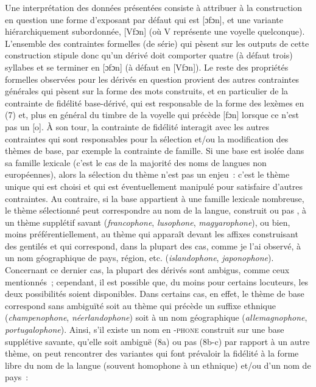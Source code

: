\documentclass[output=paper]{langsci/langscibook}
\begin{document}
Une interprétation des données présentées consiste à attribuer à la
construction en question une forme d'exposant par défaut qui est
{[}ɔfɔn{]}, et une variante hiérarchiquement subordonnée, {[}Vfɔn{]} (où
V représente une voyelle quelconque). L'ensemble des contraintes
formelles (de série) qui pèsent sur les outputs de cette construction
stipule donc qu'un dérivé doit comporter quatre (à défaut trois)
syllabes et se terminer en {[}ɔfɔn{]} (à défaut en {[}Vfɔn{]}). Le reste
des propriétés formelles observées pour les dérivés en question provient
des autres contraintes générales qui pèsent sur la forme des mots
construits, et en particulier de la contrainte de fidélité base-dérivé,
qui est responsable de la forme des lexèmes en (7) et, plus en général
du timbre de la voyelle qui précède {[}fɔn{]} lorsque ce n'est pas un
{[}o{]}. À son tour, la contrainte de fidélité interagit avec les autres
contraintes qui sont responsables pour la sélection et/ou la
modification des thèmes de base, par exemple la contrainte de famille.
Si une base est isolée dans sa famille lexicale (c'est le cas de la
majorité des noms de langues non européennes), alors la sélection du
thème n'est pas un enjeu~: c'est le thème unique qui est choisi et qui
est éventuellement manipulé pour satisfaire d'autres contraintes. Au
contraire, si la base appartient à une famille lexicale nombreuse, le
thème sélectionné peut correspondre au nom de la langue, construit ou
pas %
\citep[\emph{coréanophone}, \emph{corsophone}, \emph{picardophone}, cela correspond, grosso modo, à la «~Contrainte de fidélité à la forme libre~» de][1873]{Roche14}%
%
, à un thème supplétif savant
(\emph{francophone}, \emph{lusophone}, \emph{magyarophone}), ou bien,
moins préférentiellement, au thème qui apparaît devant les affixes
construisant des gentilés et qui correspond, dans la plupart des cas,
comme je l'ai observé, à un nom géographique de pays, région, etc.
(\emph{islandophone}, \emph{japonophone}). Concernant ce dernier cas, la
plupart des dérivés sont ambigus, comme ceux mentionnés~; cependant, il
est possible que, du moins pour certains locuteurs, les deux
possibilités soient disponibles. Dans certains cas, en effet, le thème
de base correspond sans ambiguïté soit au thème qui précède un suffixe
ethnique (\emph{champenophone}, \emph{néerlandophone}) soit à un nom
géographique (\emph{allemagnophone}, \emph{portugalophone}). Ainsi, s'il
existe un nom en \protect\hypertarget{OLEux5fLINK1}{}{}\textsc{-phone}
construit sur une base supplétive savante, qu'elle soit ambiguë (8a) ou
pas (8b-c) par rapport à un autre thème, on peut rencontrer des
variantes qui font prévaloir la fidélité à la forme libre du nom de la
langue (souvent homophone à un ethnique) et/ou d'un nom de pays~:
\end{document}
